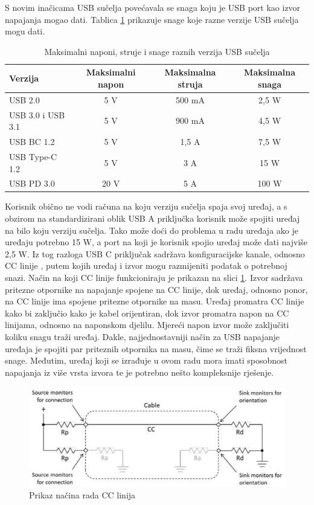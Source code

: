 S novim inačicama USB sučelja povećavala se snaga koju je USB port kao izvor napajanja mogao dati. Tablica \ref{tab:USB} prikazuje snage koje razne verzije USB sučelja mogu dati.
\begin{table}[htbp]
    \centering
    \caption{Maksimalni naponi, struje i snage raznih verzija USB sučelja \cite{ti:usb}}
    \begin{tabular}{|l|c|c|c|} \hline
    Verzija & Maksimalni napon & Maksimalna struja & Maksimalna snaga \\
    \hline
    USB 2.0 & 5 V & 500 mA & 2,5 W \\
    \hline
    USB 3.0 i USB 3.1 & 5 V & 900 mA & 4,5 W \\
    \hline
    USB BC 1.2 & 5 V & 1,5 A & 7,5 W \\
    \hline
    USB Type-C 1.2 & 5 V & 3 A & 15 W \\
    \hline
    USB PD 3.0 & 20 V & 5 A & 100 W \\
    \hline
    \end{tabular}
    \label{tab:USB}
\end{table}
Korisnik obično ne vodi računa na koju verziju sučelja spaja svoj uređaj, a s obzirom na standardizirani oblik USB A priključka korisnik može spojiti uređaj na bilo koju verziju sučelja. Tako može doći do problema u radu uređaja ako je uređaju potrebno 15 W, a port na koji je korisnik spojio uređaj može dati najviše 2,5 W. Iz tog razloga USB C priključak sadržava konfiguracijske kanale, odnosno CC linije , putem kojih uređaj i izvor mogu razmijeniti podatak o potrebnoj snazi. Način na koji CC linije funkcioniraju je prikazan na slici \ref{slk:USB_CC_LINES}. Izvor sadržava pritezne otpornike na napajanje spojene na CC linije, dok uređaj, odnosno ponor, na CC linije ima spojene pritezne otpornike na masu. Uređaj promatra CC linije kako bi zaključio kako je kabel orijentiran, dok izvor promatra napon na CC linijama, odnosno na naponskom djelilu. Mjereći napon izvor može zaključiti koliku snagu traži uređaj. Dakle, najjednostavniji način za USB napajanje uređaja je spojiti par priteznih otpornika na masu, čime se traži fiksna vrijednost snage. Međutim, uređaj koji se izrađuje u ovom radu mora imati sposobnost napajanja iz više vrsta izvora te je potrebno nešto kompleksnije rješenje.
\begin{figure}[htb]
    \centering
    \includegraphics[width=10 cm]{Figures/USB_CC_LINES.png}
    \caption{Prikaz načina rada CC linija \cite{ti:usb}}
    \label{slk:USB_CC_LINES}
\end{figure}

